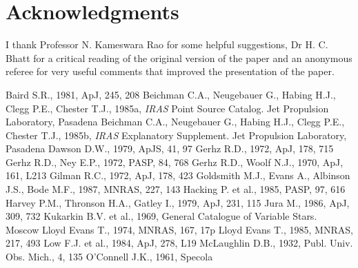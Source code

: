 \documentclass[useAMS,usedcolumn,usegraphicx,usenatbib]{mn2e}
\begin{document}
\section*{Acknowledgments}

I thank Professor N. Kameswara Rao for some helpful suggestions,
Dr H. C. Bhatt for a critical reading of the original version of the
paper and an anonymous referee for very useful comments that improved
the presentation of the paper.


\begin{thebibliography}{99}

 Baird S.R., 1981,
ApJ, 245, 208
 Beichman
C.A., Neugebauer G., Habing H.J., Clegg P.E., Chester T.J., 1985a,
{\it IRAS\/} Point Source Catalog. Jet Propulsion Laboratory,
Pasadena
 Beichman
C.A., Neugebauer G., Habing H.J., Clegg P.E., Chester T.J., 1985b,
{\it IRAS\/} Explanatory Supplement. Jet Propulsion Laboratory,
Pasadena
 Dawson D.W., 1979,
ApJS, 41, 97
 Gerhz R.D., 1972, ApJ,
178, 715
 Gerhz R.D., Ney
E.P., 1972, PASP, 84, 768
 Gerhz R.D., Woolf N.J.,
1970, ApJ, 161, L213
 Gilman R.C., 1972, ApJ, 178, 423
 Goldsmith M.J., Evans A.,
Albinson J.S., Bode M.F., 1987, MNRAS, 227, 143
 Hacking P. et al., 1985,
PASP, 97, 616
Harvey P.M., Thronson H.A., Gatley I., 1979, ApJ, 231, 115
 Jura M., 1986, ApJ, 309, 732
 Kukarkin B.V. et al.,
1969, General Catalogue of Variable Stars. Moscow
 Lloyd Evans T., 1974, MNRAS,
167, 17{\sc p}
 Lloyd Evans T., 1985, MNRAS,
217, 493
 Low F.J. et al., 1984, ApJ,
278, L19
 McLaughlin D.B., 1932, Publ. Univ.
Obs. Mich., 4, 135
 O'Connell J.K., 1961, Specola

\end{thebibliography}
\end{document}

